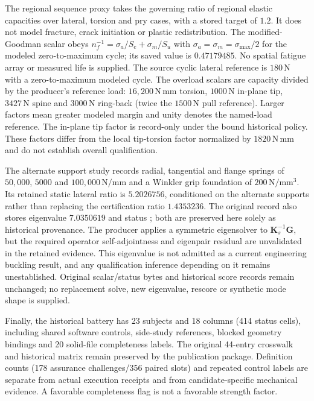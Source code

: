 The regional sequence proxy takes the governing ratio of regional elastic capacities over lateral, torsion and pry cases, with a stored target of $1.2$. It does not model fracture, crack initiation or plastic redistribution. The modified-Goodman scalar obeys $n_f^{-1}=\sigma_a/S_e+\sigma_m/S_u$ with $\sigma_a=\sigma_m=\sigma_{\max}/2$ for the modeled zero-to-maximum cycle; its saved value is $0.47179485$. No spatial fatigue array or measured life is supplied. The source cyclic lateral reference is $180\,\mathrm{N}$ with a zero-to-maximum modeled cycle. The overload scalars are capacity divided by the producer's reference load: $16{,}200\,\mathrm{N\,mm}$ torsion, $1000\,\mathrm{N}$ in-plane tip, $3427\,\mathrm{N}$ spine and $3000\,\mathrm{N}$ ring-back (twice the $1500\,\mathrm{N}$ pull reference). Larger factors mean greater modeled margin and unity denotes the named-load reference. The in-plane tip factor is record-only under the bound historical policy. These factors differ from the local tip-torsion factor normalized by $1820\,\mathrm{N\,mm}$ and do not establish overall qualification.

The alternate support study records radial, tangential and flange springs of $50{,}000$, $5000$ and $100{,}000\,\mathrm{N/mm}$ and a Winkler grip foundation of $200\,\mathrm{N/mm^3}$. Its retained static lateral ratio is $5.2026756$, conditioned on the alternate supports rather than replacing the certification ratio $1.4353236$. The original record also stores eigenvalue $7.0350619$ and status ; both are preserved here solely as historical provenance. The producer applies a symmetric eigensolver to $\mathbf K_s^{-1}\mathbf G$, but the required operator self-adjointness and eigenpair residual are unvalidated in the retained evidence. This eigenvalue is not admitted as a current engineering buckling result, and any qualification inference depending on it remains unestablished. Original scalar/status bytes and historical score records remain unchanged; no replacement solve, new eigenvalue, rescore or synthetic mode shape is supplied.

Finally, the historical battery has 23 subjects and 18 columns (414 status cells), including shared software controls, side-study references, blocked geometry bindings and 20 solid-file completeness labels. The original 44-entry crosswalk and historical matrix remain preserved by the publication package. Definition counts (178 assurance challenges/356 paired slots) and repeated control labels are separate from actual execution receipts and from candidate-specific mechanical evidence. A favorable completeness flag is not a favorable strength factor.
